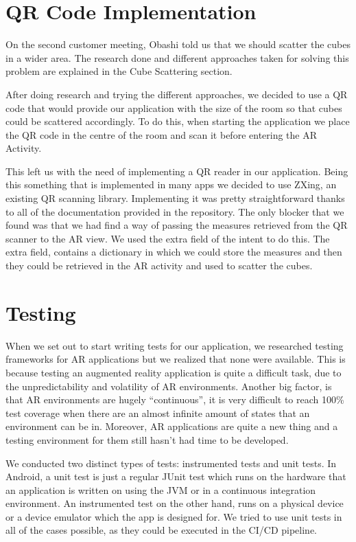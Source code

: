 \documentclass{l3proj}
\begin{document}
\section{QR Code Implementation}
On the second customer meeting, Obashi told us that we should scatter the
cubes in a wider area. The research done and different approaches taken
for solving this problem are explained in the Cube Scattering section. %

After doing research and trying the different approaches, we decided to
use a QR code that would provide our application with the size of
the room so that cubes could be scattered accordingly. To do this,
when starting the application we place the QR code in the centre of
the room and scan it before entering the AR Activity.

This left us with the need of implementing a QR reader in our application.
Being this something that is implemented in many apps we decided to use
ZXing\cite{ZXing}, an existing QR scanning library. Implementing it was
pretty straightforward thanks to all of the documentation provided in
the repository. The only blocker that we found was that we had find a
way of passing the measures retrieved from the QR scanner to the AR view.
We used the extra field of the intent to do this. The extra field,
contains a dictionary in which we could store the measures and then
they could be retrieved in the AR activity and used to scatter the
cubes.

\section{Testing}
When we set out to start writing tests for our application, we researched testing 
frameworks for AR applications but we realized that none were available.
This is because testing an augmented reality application is quite a difficult task, 
due to the unpredictability and volatility of AR environments. 
Another big factor, is that AR environments are hugely “continuous”, it is 
very difficult to reach 100\% test coverage when there are an almost infinite 
amount of states that an environment can be in. Moreover, AR applications are
quite a new thing and a testing environment for them still hasn't had time to
be developed\cite{ArTesting}.

We conducted two distinct types of tests: instrumented tests and unit tests. 
In Android, a unit test is just a regular JUnit test which runs on the hardware that an application is 
written on using the JVM or in a continuous integration environment. 
An instrumented test on the other hand, runs on a physical device or a device 
emulator which the app is designed for\cite{AndroidTests}. We tried to use unit 
tests in all of the cases possible, as they could be executed in the CI/CD pipeline. 
\end{document}
